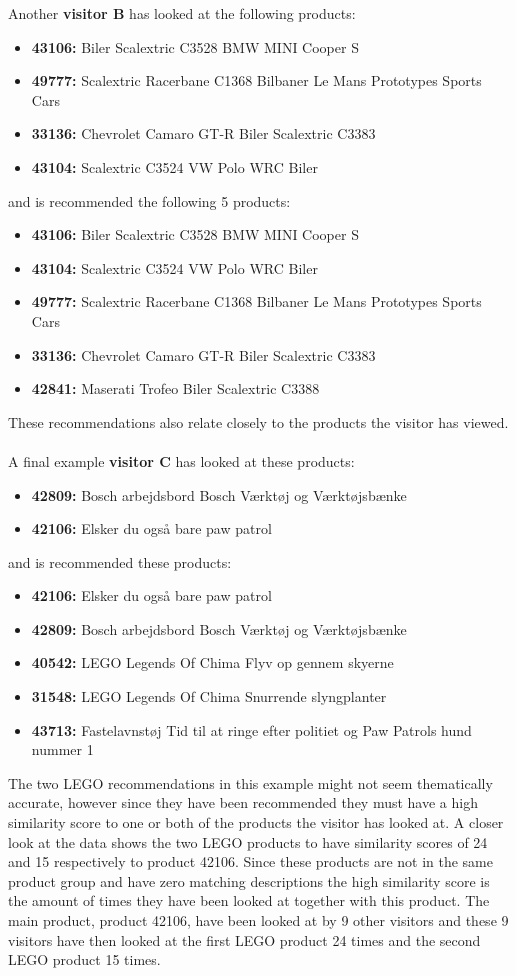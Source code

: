 Another \textbf{visitor B} has looked at the following products:
\begin{itemize}
\item \textbf{43106: }Biler Scalextric C3528 BMW MINI Cooper S
\item \textbf{49777: }Scalextric Racerbane C1368 Bilbaner Le Mans Prototypes Sports Cars
\item \textbf{33136: }Chevrolet Camaro GT-R Biler Scalextric C3383 
\item \textbf{43104: }Scalextric C3524 VW Polo WRC Biler
\end{itemize}
and is recommended the following 5 products:
\begin{itemize}
\item \textbf{43106: }Biler Scalextric C3528 BMW MINI Cooper S
\item \textbf{43104: }Scalextric C3524 VW Polo WRC Biler
\item \textbf{49777: }Scalextric Racerbane C1368 Bilbaner Le Mans Prototypes Sports Cars
\item \textbf{33136: }Chevrolet Camaro GT-R Biler Scalextric C3383
\item \textbf{42841: }Maserati Trofeo Biler Scalextric C3388
\end{itemize}

These recommendations also relate closely to the products the visitor has viewed. \\\\

A final example \textbf{visitor C} has looked at these products:
\begin{itemize}
\item \textbf{42809: }Bosch arbejdsbord Bosch Værktøj og Værktøjsbænke
\item \textbf{42106: }Elsker du også bare paw patrol
\end{itemize}
and is recommended these products:
\begin{itemize}
\item \textbf{42106: }Elsker du også bare paw patrol
\item \textbf{42809: }Bosch arbejdsbord Bosch Værktøj og Værktøjsbænke
\item \textbf{40542: }LEGO Legends Of Chima Flyv op gennem skyerne
\item \textbf{31548:} LEGO Legends Of Chima Snurrende slyngplanter
\item \textbf{43713:} Fastelavnstøj Tid til at ringe efter politiet og Paw Patrols hund nummer 1
\end{itemize}
The two LEGO recommendations in this example might not seem thematically accurate, however since they have been recommended they must have a high similarity score to one or both of the products the visitor has looked at. A closer look at the data shows the two LEGO products to have similarity scores of 24 and 15 respectively to product 42106. Since these products are not in the same product group and have zero matching descriptions the high similarity score is the amount of times they have been looked at together with this product. The main product, product 42106, have been looked at by 9 other visitors and these 9 visitors have then looked at the first LEGO product 24 times and the second LEGO product 15 times.

